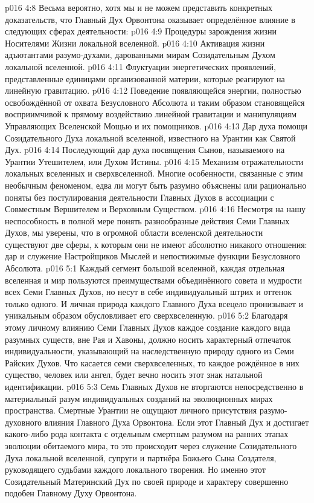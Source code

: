 \vs p016 4:8 \pc Весьма вероятно, хотя мы и не можем представить конкретных доказательств, что Главный Дух Орвонтона оказывает определённое влияние в следующих сферах деятельности:
\vs p016 4:9 Процедуры зарождения жизни Носителями Жизни локальной вселенной.
\vs p016 4:10 Активация жизни адъютантами разумо\hyp{}духами, дарованными мирам Созидательным Духом локальной вселенной.
\vs p016 4:11 Флуктуации энергетических проявлений, представленные единицами организованной материи, которые реагируют на линейную гравитацию.
\vs p016 4:12 Поведение появляющейся энергии, полностью освобождённой от охвата Безусловного Абсолюта и таким образом становящейся восприимчивой к прямому воздействию линейной гравитации и манипуляциям Управляющих Вселенской Мощью и их помощников.
\vs p016 4:13 Дар духа помощи Созидательного Духа локальной вселенной, известного на Урантии как Святой Дух.
\vs p016 4:14 Последующий дар духа посвящения Сынов, называемого на Урантии Утешителем, или Духом Истины.
\vs p016 4:15 Механизм отражательности локальных вселенных и сверхвселенной. Многие особенности, связанные с этим необычным феноменом, едва ли могут быть разумно объяснены или рационально поняты без постулирования деятельности Главных Духов в ассоциации с Совместным Вершителем и Верховным Существом.
\vs p016 4:16 \pc Несмотря на нашу неспособность в полной мере понять разнообразные действия Семи Главных Духов, мы уверены, что в огромной области вселенской деятельности существуют две сферы, к которым они не имеют абсолютно никакого отношения: дар и служение Настройщиков Мыслей и непостижимые функции Безусловного Абсолюта.
\vs p016 5:1 Каждый сегмент большой вселенной, каждая отдельная вселенная и мир пользуются преимуществами объединённого совета и мудрости всех Семи Главных Духов, но несут в себе индивидуальный штрих и оттенок только одного. И личная природа каждого Главного Духа всецело пронизывает и уникальным образом обусловливает его сверхвселенную.
\vs p016 5:2 Благодаря этому личному влиянию Семи Главных Духов каждое создание каждого вида разумных существ, вне Рая и Хавоны, должно носить характерный отпечаток индивидуальности, указывающий на наследственную природу одного из Семи Райских Духов. Что касается семи сверхвселенных, то каждое рождённое в них существо, человек или ангел, будет вечно носить этот знак натальной идентификации.
\vs p016 5:3 Семь Главных Духов не вторгаются непосредственно в материальный разум индивидуальных созданий на эволюционных мирах пространства. Смертные Урантии не ощущают личного присутствия разумо\hyp{}духовного влияния Главного Духа Орвонтона. Если этот Главный Дух и достигает какого\hyp{}либо рода контакта с отдельным смертным разумом на ранних этапах эволюции обитаемого мира, то это происходит через служение Созидательного Духа локальной вселенной, супруги и партнёра Божьего Сына Создателя, руководящего судьбами каждого локального творения. Но именно этот Созидательный Материнский Дух по своей природе и характеру совершенно подобен Главному Духу Орвонтона.
